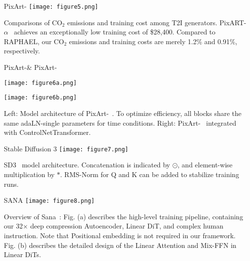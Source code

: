 \begin{refsection}
  \begin{frame}{PixArt-\alpha}
    \centering
    \texttt{[image: figure5.png]}

    {\scriptsize
    Comparisons of CO$_2$ emissions and training cost among T2I generators. PixART-$\alpha$~\parencite{chenPixArtaFastTraining2023} achieves an exceptionally low training cost of \$28,400. Compared to RAPHAEL, our CO$_2$ emissions and training costs are merely 1.2\% and 0.91\%, respectively.
    }
    \bottomleftrefs
  \end{frame}
\end{refsection}

\begin{refsection}
  \begin{frame}{PixArt-\alpha \& PixArt-\delta}
    \centering
    \begin{minipage}{0.3\linewidth}
      \centering
      \texttt{[image: figure6a.png]}
    \end{minipage}
    \hfill
    \begin{minipage}{0.35\linewidth}
      \centering
      \texttt{[image: figure6b.png]}
    \end{minipage}

    {\scriptsize
    Left: Model architecture of PixArt-\alpha~\parencite{chenPixArtaFastTraining2023}. To optimize efficiency, all blocks share the same adaLN-single parameters for time conditions. Right: PixArt-\delta~\parencite{chenPIXARTdFastControllable2024} integrated with ControlNetTransformer.      
    }
    \bottomleftrefs
  \end{frame}
\end{refsection}

\begin{refsection}
  \begin{frame}{Stable Diffusion 3}
    \centering
    \texttt{[image: figure7.png]}

    {\scriptsize
    SD3~\parencite{esserScalingRectifiedFlow2024a} model architecture. Concatenation is indicated by $\odot$, and element-wise multiplication by $*$. RMS-Norm for Q and K can be added to stabilize training runs.
    }
    \bottomleftrefs
  \end{frame}
\end{refsection}

\begin{refsection}
  \begin{frame}{SANA}
    \centering
    \texttt{[image: figure8.png]}

    {\scriptsize
    Overview of Sana~\parencite{xieSANAEfficientHighResolution2024}: Fig. (a) describes the high-level training pipeline, containing our 32× deep compression Autoencoder, Linear DiT, and complex human instruction. Note that Positional embedding is not required in our framework. Fig. (b) describes the detailed design of the Linear Attention and Mix-FFN in Linear DiTs.
    }
    \bottomleftrefs
  \end{frame}
\end{refsection}

